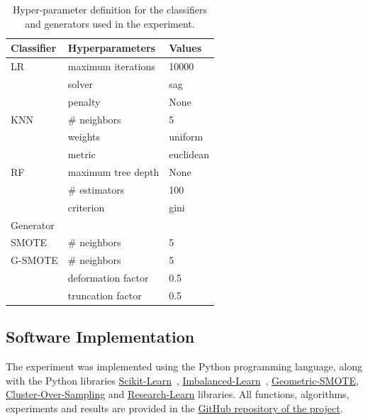 \documentclass[parskip=full]{scrartcl}
\begin{document}
\begin{table}[H]
	\centering
	\begin{tabular}{lll}
		\toprule
		Classifier & Hyperparameters      & Values             \\
		\midrule
		LR         & maximum iterations   & 10000              \\
		           & solver               & sag                \\
                   & penalty              & None               \\
		KNN        & \# neighbors         & 5                  \\
                   & weights              & uniform            \\
                   & metric               & euclidean          \\
		RF         & maximum tree depth   & None               \\
		           & \# estimators        & 100                \\
                   & criterion            & gini               \\
		\toprule
		Generator  &                      &                    \\
		\midrule
		SMOTE      & \# neighbors         & 5                  \\
		G-SMOTE    & \# neighbors         & 5                  \\
                   & deformation factor   & 0.5                \\
                   & truncation factor    & 0.5                \\
		\bottomrule
	\end{tabular}
    \caption{\label{tab:grid}Hyper-parameter definition for the classifiers and
    generators used in the experiment.}
\end{table}

\subsection{Software Implementation}

The experiment was implemented using the Python programming language, along
with the Python libraries
\href{https://scikit-learn.org/stable/}{Scikit-Learn}~\cite{Pedregosa2011},
\href{https://imbalanced-learn.org/en/stable/}{Imbalanced-Learn}~\cite{JMLR:v18:16-365},
\href{https://geometric-smote.readthedocs.io/en/latest/?badge=latest}{Geometric-SMOTE},
\href{https://cluster-over-sampling.readthedocs.io/en/latest/?badge=latest}{Cluster-Over-Sampling}
and
\href{https://research-learn.readthedocs.io/en/latest/?badge=latest}{Research-Learn}
libraries.  All functions, algorithms, experiments and results are provided in
the
\href{https://github.com/AlgoWit/publications/tree/master/remote-sensing/al-generator}{GitHub
repository of the project}.
\end{document}
